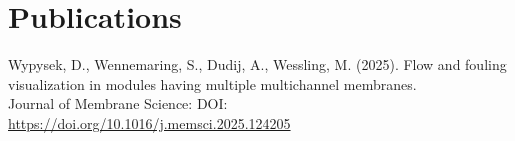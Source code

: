 \section{Publications}

\begin{highlights}
    \item Wypysek, D., Wennemaring, S., Dudij, A., Wessling, M. (2025). Flow and fouling visualization in modules having multiple multichannel membranes.\\
    Journal of Membrane Science: DOI: \\
    \href{https://doi.org/10.1016/j.memsci.2025.124205}{https://doi.org/10.1016/j.memsci.2025.124205}
\end{highlights}
